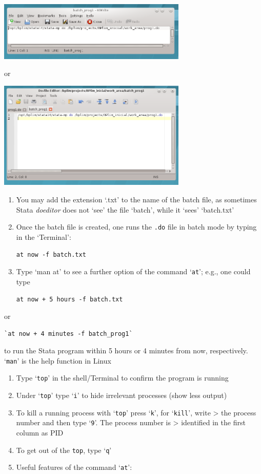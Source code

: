 \documentclass[
  11pt,
  a4paper,
]{article}
\begin{document}
\includegraphics[width=3.54331in,height=1.11324in]{./media/image15.png}

or

\includegraphics[width=3.54331in,height=2.01342in]{./media/image16.png}

\begin{enumerate}
\def\labelenumi{\arabic{enumi}.}
\setcounter{enumi}{6}
\item
  You may add the extension `.txt' to the name of the batch file, as
  sometimes Stata \emph{doeditor} does not `see' the file `batch', while
  it `sees' `batch.txt'
\item
  Once the batch file is created, one runs the \texttt{.do} file in
  batch mode by typing in the `Terminal':

  \texttt{at\ now\ -f\ batch.txt}
\item
  Type `man at' to see a further option of the command `\texttt{at}';
  e.g., one could type

  \texttt{at\ now\ +\ 5\ hours\ -f\ batch.txt}
\end{enumerate}

or

\begin{verbatim}
`at now + 4 minutes -f batch_prog1`
\end{verbatim}

to run the Stata program within 5 hours or 4 minutes from now,
respectively. `\texttt{man}' is the help function in Linux

\begin{enumerate}
\def\labelenumi{\arabic{enumi}.}
\setcounter{enumi}{9}
\item
  Type `\texttt{top}' in the shell/Terminal to confirm the program is
  running
\item
  Under `\texttt{top}' type `\texttt{i}' to hide irrelevant processes
  (show less output)
\item
  To kill a running process with `\texttt{top}' press `\texttt{k}', for
  `\texttt{kill}', write \textgreater{} the process number and then type
  `\texttt{9}'. The process number is \textgreater{} identified in the
  first column as PID
\item
  To get out of the \texttt{top}, type `\texttt{q}'
\item
  Useful features of the command `\texttt{at}':
\end{enumerate}
\end{document}
